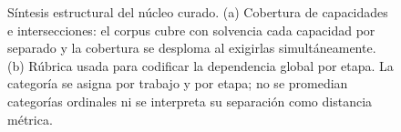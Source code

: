 \begin{figure}[!htbp]
\begin{minipage}[t]{0.50\linewidth}
{}
  \end{minipage}
  \caption[Síntesis estructural del núcleo curado.]{Síntesis estructural del
  núcleo curado. (a) Cobertura de capacidades e intersecciones: el corpus cubre
  con solvencia cada capacidad por separado y la cobertura se desploma al
  exigirlas simultáneamente. (b) Rúbrica usada para codificar la dependencia
  global por etapa. La categoría se asigna por trabajo y por etapa; no se
  promedian categorías ordinales ni se interpreta su separación como distancia
  métrica.}
  \label{fig:lit-coverage-rubric}
\end{figure}
